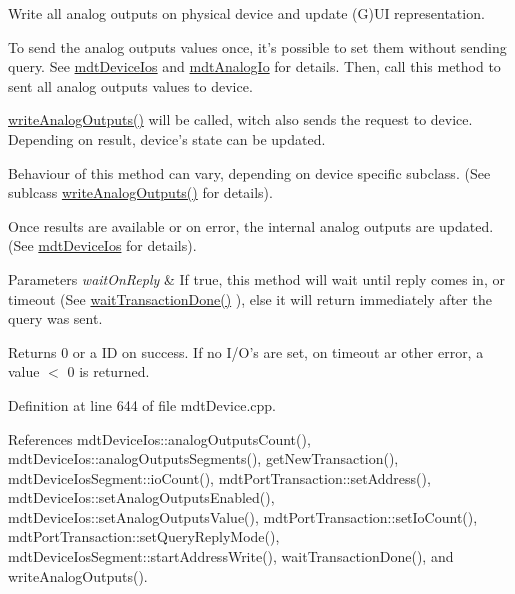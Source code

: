 Write all analog outputs on physical device and update (G)U\-I representation. 

To send the analog outputs values once, it's possible to set them without sending query. See \hyperlink{classmdt_device_ios}{mdt\-Device\-Ios} and \hyperlink{classmdt_analog_io}{mdt\-Analog\-Io} for details. Then, call this method to sent all analog outputs values to device.

\hyperlink{classmdt_device_a2d82cb0920e4e0628186e59f9b4de7d4}{write\-Analog\-Outputs()} will be called, witch also sends the request to device. Depending on result, device's state can be updated.

Behaviour of this method can vary, depending on device specific subclass. (See sublcass \hyperlink{classmdt_device_a2d82cb0920e4e0628186e59f9b4de7d4}{write\-Analog\-Outputs()} for details).

Once results are available or on error, the internal analog outputs are updated. (See \hyperlink{classmdt_device_ios}{mdt\-Device\-Ios} for details).


\begin{DoxyParams}{Parameters}
{\em wait\-On\-Reply} & If true, this method will wait until reply comes in, or timeout (See \hyperlink{classmdt_device_ab937015c1a319b7234442a4cc29a02a8}{wait\-Transaction\-Done()} ), else it will return immediately after the query was sent. \\
\hline
\end{DoxyParams}
\begin{DoxyReturn}{Returns}
0 or a I\-D on success. If no I/\-O's are set, on timeout ar other error, a value $<$ 0 is returned. 
\end{DoxyReturn}


Definition at line 644 of file mdt\-Device.\-cpp.



References mdt\-Device\-Ios\-::analog\-Outputs\-Count(), mdt\-Device\-Ios\-::analog\-Outputs\-Segments(), get\-New\-Transaction(), mdt\-Device\-Ios\-Segment\-::io\-Count(), mdt\-Port\-Transaction\-::set\-Address(), mdt\-Device\-Ios\-::set\-Analog\-Outputs\-Enabled(), mdt\-Device\-Ios\-::set\-Analog\-Outputs\-Value(), mdt\-Port\-Transaction\-::set\-Io\-Count(), mdt\-Port\-Transaction\-::set\-Query\-Reply\-Mode(), mdt\-Device\-Ios\-Segment\-::start\-Address\-Write(), wait\-Transaction\-Done(), and write\-Analog\-Outputs().

